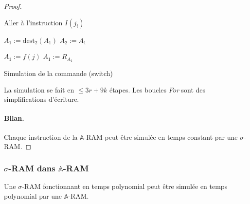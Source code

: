 \documentclass{report}
\newcommand{\bbA}{\mathbb{A}}
\begin{document}
\begin{proof}
\begin{algorithm}[H]
{{								%
								
								Aller à l'instruction $I\left(j_i\right)$\;
								
								}
								{
									
									$A_1 := \text{dest}_2(A_1)$\;
									$A_2 := A_1$\;
									
									
									$A_1 := f(j)$\;
									$A_1 := R_{A_1}$\;
									
								}
							}
					
						\caption{Simulation de la commande (switch)}
					\end{algorithm}
					
					\espace 
					
					La simulation se fait en $\leq 3r + 9k$ étapes. Les boucles \emph{For} sont des simplifications d'écriture.
				
					\paragraph{Bilan.}
					Chaque instruction de la $\bbA$-RAM peut être simulée en temps constant par une $\sigma$-RAM.
				\end{proof}
	
	
				\subsubsection{$\sigma$-RAM dans $\bbA$-RAM}
				\label{subsubsec:sim_sigma_RAM_A_RAM}
				
				
				\begin{lemma}
					\label{lem:sim_sigma_RAM_A_RAM}
					Une $\sigma$-RAM fonctionnant en temps polynomial peut être simulée en temps polynomial par une $\bbA$-RAM.
				\end{lemma}
	
\end{document}
